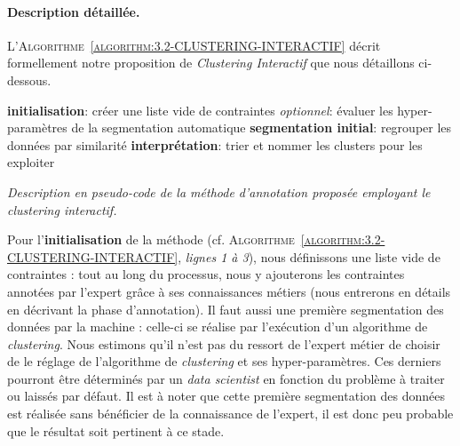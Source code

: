 		\paragraph{Description détaillée.}
		
		L'\textsc{Algorithme~\ref{algorithm:3.2-CLUSTERING-INTERACTIF}} décrit formellement notre proposition de \textit{Clustering Interactif} que nous détaillons ci-dessous.
		\begin{algorithm}
			\textbf{initialisation}: créer une liste vide de contraintes \;
			\textit{optionnel}: évaluer les hyper-paramètres de la segmentation automatique \;
			\textbf{segmentation initial}: regrouper les données par similarité \;
			\textbf{interprétation}: trier et nommer les clusters pour les exploiter \;
			\caption{\textit{
				Description en pseudo-code de la méthode d'annotation proposée employant le \textit{clustering} interactif.
			}}
			\label{algorithm:3.2-CLUSTERING-INTERACTIF}
		\end{algorithm}
		
		Pour l'\textbf{initialisation} de la méthode (cf. \textsc{Algorithme~\ref{algorithm:3.2-CLUSTERING-INTERACTIF}}, \textit{lignes 1 à 3}), nous définissons une liste vide de contraintes : tout au long du processus, nous y ajouterons les contraintes annotées par l'expert grâce à ses connaissances métiers (nous entrerons en détails en décrivant la phase d'annotation).
		Il faut aussi une première segmentation des données par la machine : celle-ci se réalise par l'exécution d'un algorithme de \textit{clustering}.
		Nous estimons qu'il n'est pas du ressort de l'expert métier de choisir de le réglage de l'algorithme de \textit{clustering} et ses hyper-paramètres.
		Ces derniers pourront être déterminés par un \textit{data scientist} en fonction du problème à traiter ou laissés par défaut.
		Il est à noter que cette première segmentation des données est réalisée sans bénéficier de la connaissance de l'expert, il est donc peu probable que le résultat soit pertinent à ce stade.
		
